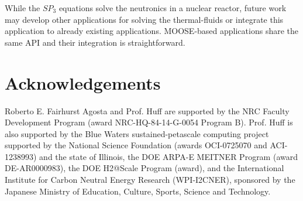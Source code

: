 \documentclass{anstrans}
\begin{document}
While the $SP_3$ equations solve the neutronics in a nuclear reactor, future work may develop other applications for solving the thermal-fluids or integrate this application to already existing applications.
MOOSE-based applications share the same API and their integration is straightforward.


\section{Acknowledgements}

Roberto E. Fairhurst Agosta and Prof. Huff are supported by the \gls{NRC} Faculty Development Program (award NRC-HQ-84-14-G-0054 Program B).
Prof. Huff is also supported by the Blue Waters sustained-petascale computing project supported by the National Science Foundation (awards OCI-0725070 and ACI-1238993) and the state of Illinois, the DOE ARPA-E MEITNER Program (award DE-AR0000983), the DOE H2@Scale Program (award), and the International Institute for Carbon Neutral Energy Research (WPI-I2CNER), sponsored by the Japanese Ministry of Education, Culture, Sports, Science and Technology.



\end{document}
